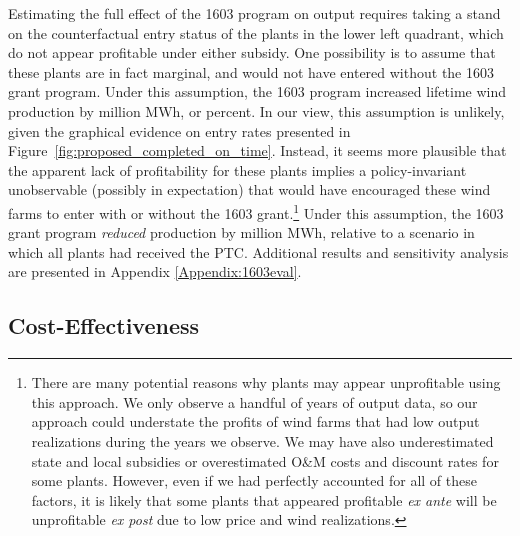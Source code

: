 \documentclass[12pt]{article}
\begin{document}
Estimating the full effect of the 1603 program on output requires taking a stand on the counterfactual entry status of the  \unskip plants in the lower left quadrant, which do not appear profitable under either subsidy. One possibility is to assume that these plants are in fact marginal, and would not have entered without the 1603 grant program. Under this assumption, the 1603 program increased lifetime wind production by  \unskip million MWh, or  \unskip percent. In our view, this assumption is unlikely, given the graphical evidence on entry rates presented in Figure~\ref{fig:proposed_completed_on_time}. Instead, it seems more plausible that the apparent lack of profitability for these plants implies a policy-invariant unobservable (possibly in expectation) that would have encouraged these wind farms to enter with or without the 1603 grant.\footnote{There are many potential reasons why plants may appear unprofitable using this approach. We only observe a handful of years of output data, so our approach could understate the profits of wind farms that had low output realizations during the years we observe. We may have also underestimated state and local subsidies or overestimated O\&M costs and discount rates for some plants. However, even if we had perfectly accounted for all of these factors, it is likely that some plants that appeared profitable \emph{ex ante} will be unprofitable \emph{ex post} due to low price and wind realizations.} Under this assumption, the 1603 grant program \textit{reduced} production by million MWh, relative to a scenario in which all plants had received the PTC. Additional results and sensitivity analysis are presented in Appendix \ref{Appendix:1603eval}.

\subsection{Cost-Effectiveness \label{sec:costEffectiveness}}
\end{document}

